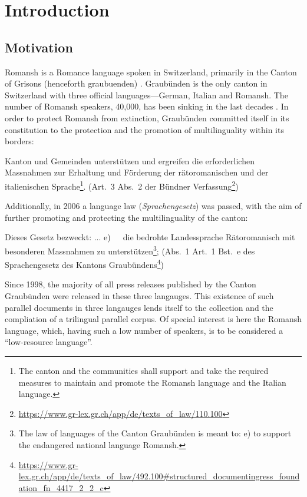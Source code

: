 \chapter{Introduction}
\section{Motivation}
Romansh is a Romance language spoken in Switzerland, primarily in the Canton of Grisons (henceforth \gls{graubuenden}) \autocite[173]{bossong2008}. 
Graubünden is the only canton in Switzerland with three official languages---German, Italian and Romansh. 
The number of Romansh speakers, 40,000, has been sinking in the last decades \autocite{bundesamt2020}. 
In order to protect Romansh from extinction, Graubünden committed itself in its constitution to the protection and the promotion of multilinguality within its borders: 

\begin{displayquote}
Kanton und Gemeinden unterstützen und ergreifen die erforderlichen Massnahmen zur Erhaltung und Förderung der rätoromanischen und der italienischen Sprache\footnote{The canton and the communities shall support and take the required measures to maintain and promote the Romansh language and the Italian language.}. 
(Art.~3 Abs.~2 der Bündner Verfassung\footnote{\url{https://www.gr-lex.gr.ch/app/de/texts_of_law/110.100}}) 
\end{displayquote}

Additionally, in 2006 a language law (\emph{Sprachengesetz}) was passed, with the aim of further promoting and protecting the multilinguality of the canton:
\begin{displayquote}
Dieses Gesetz bezweckt:
...
e)~~~die  bedrohte  Landessprache  Rätoromanisch  mit  besonderen  Massnahmen zu unterstützen\footnote{The law of languages of the Canton Graubünden is meant to: e) to support the endangered national language Romansh.}; (Abs.~1 Art.~1 Bst.~e des Sprachengesetz des Kantons Graubündens\footnote{\url{https://www.gr-lex.gr.ch/app/de/texts_of_law/492.100\#structured_documentingress_foundation_fn_4417_2_2_c}})
\end{displayquote}


Since 1998, the majority of all press releases published by the Canton Graubünden were released in these three langauges. 
This existence of such parallel documents in three langauges lends itself to the collection and the compliation of a trilingual parallel corpus. 
Of special interest is here the Romansh language, which, having such a low number of speakers, is to be considered a  \enquote{low-resource language}.


